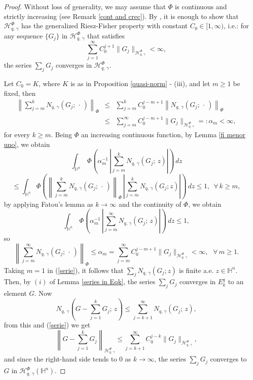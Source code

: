 \documentclass[oneside,10pt]{article}
\begin{document}
\begin{proof} Without loss of generality, we may assume that $\Phi$ is continuous and strictly increasing (see Remark \ref{cont and crec}). 
By \cite[Theoremm 3.3]{Nekvinda}, it is enough to show that $\mathcal{H}^{\Phi}_{q, \, \gamma}$ has the generalized Riesz-Fisher property 
with constant $C_0 \in [1, \infty)$, i.e.: for any sequence $\{ G_j \}$ in $\mathcal{H}^{\Phi}_{q, \, \gamma}$ that satisfies 
\[
\sum_{j=1}^{\infty} C_{0}^{j+1} \| G_j \|_{\mathcal{H}^{\Phi}_{q, \, \gamma}} < \infty,
\]
the series $\sum_{j} G_j$ converges in $\mathcal{H}^{\Phi}_{q, \, \gamma}$.

Let $C_0 = K$, where $K$ is as in Proposition \ref{quasi-norm} - (iii), and let $m \geq 1$ be fixed, then 
\begin{eqnarray*}
\left\| \sum_{j=m}^{k} N_{q, \, \gamma}(G_{j}; \, \cdot \,) \right\|_{\Phi} &\leq& \sum_{j=m}^{k} C_{0}^{j-m+1} 
\left\| N_{q, \, \gamma}(G_{j}; \, \cdot \,) \right\|_{\Phi} \\
&\leq& \sum_{j=m}^{\infty} C_{0}^{j-m+1} \| G_j \|_{\mathcal{H}^{\Phi}_{q, \, \gamma}} =: \alpha_m < \infty,
\end{eqnarray*}
for every $k \geq m$. Being $\Phi$ an increasing continuous function, by Lemma \ref{fi menor uno}, we obtain 
\[
\int_{\mathbb{H}^{n}} \, \Phi\left( \alpha_m^{-1} \, \left|\sum_{j=m}^{k} N_{q, \, \gamma}(G_{j}; \, z ) \right| \right) \, dz
\] 
\[
\leq \int_{\mathbb{H}^{n}} \Phi \left( \left\| \sum_{j=m}^{k} N_{q, \, \gamma}(G_{j}; \, \cdot \,) \right\|_{\Phi} \, 
\left| \sum_{j=m}^{k} N_{q, \, \gamma}(G_{j};  z ) \right| \right) \, dz \leq 1, \,\,\, \forall \, k \geq m,
\]
by applying Fatou's lemma as $k \rightarrow \infty$ and the continuity of $\Phi$, we obtain
\[
\int_{\mathbb{H}^{n}} \, \Phi \left( \alpha_m^{-1} \, \left| \sum_{j=m}^{\infty} N_{q, \, \gamma}(G_{j}; \, z ) \right| \right) \, dz \leq 1,
\]
so
\begin{equation}
\left\|  \sum_{j=m}^{\infty} N_{q, \, \gamma}(G_{j}; \, \cdot \,) \right\|_{\Phi} \leq \alpha_m = \sum_{j=m}^{\infty} C_{0}^{j-m+1} 
\| G_j \|_{\mathcal{H}^{\Phi}_{q, \, \gamma}} < \infty, \,\,\,\, \forall \, m \geq 1  \label{serie}.
\end{equation}
Taking $m = 1$ in (\ref{serie}), it follows that $\sum_{j} N_{q, \, \gamma}(G_{j}; z)$ is finite a.e. 
$z \in \mathbb{H}^{n}$. Then, by $(i)$ of Lemma \ref{series in Eqk}, the series $\sum_j G_j$ converges in $E_{k}^{q}$ to an element $G$. Now 
\[
N_{q, \, \gamma}\left( G - \sum_{j=1}^{k} G_j; \, z \right) \leq \sum_{j=k+1}^{\infty} N_{q, \, \gamma} (G_j; \, z),
\]
from this and (\ref{serie}) we get
\[
\left\| G - \sum_{j=1}^{k} G_j \right\|_{\mathcal{H}^{\Phi}_{q, \, \gamma}} \leq \sum_{j=k+1}^{\infty} C_{0}^{j-k} 
\| G_j \|_{\mathcal{H}^{\Phi}_{q, \, \gamma}},
\]
and since the right-hand side tends to $0$ as $k \rightarrow \infty$, the series $\sum_{j}G_j$ converges to $G$ in $\mathcal{H}^{\Phi}_{q, \, \gamma}(\mathbb{H}^{n})$.
\end{proof}
\end{document}
